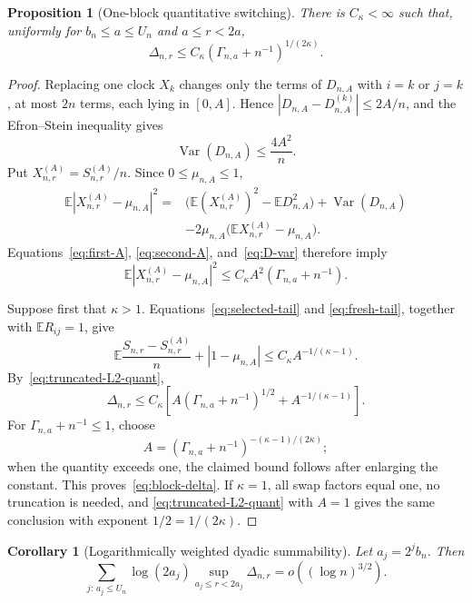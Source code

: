 \documentclass[11pt]{article}
\newtheorem{proposition}[theorem]{Proposition}
\newtheorem{corollary}[theorem]{Corollary}
\theoremstyle{remark}
\newcommand{\Ee}{\mathbb E}
\newcommand{\Var}{\operatorname{Var}}
\begin{document}
\begin{proposition}[One-block quantitative switching]\label{prop:block}
There is $C_\kappa<\infty$ such that, uniformly for
$b_n\leq a\leq U_n$ and $a\leq r<2a$,
\begin{equation}\label{eq:block-delta}
 \Delta_{n,r}\leq C_\kappa(\Gamma_{n,a}+n^{-1})^{1/(2\kappa)}.
\end{equation}
\end{proposition}

\begin{proof}
Replacing one clock $X_k$ changes only the terms of $D_{n,A}$ with
$i=k$ or $j=k$, at most $2n$ terms, each lying in $[0,A]$.  Hence
$|D_{n,A}-D_{n,A}^{(k)}|\leq2A/n$, and the Efron--Stein inequality gives
\begin{equation}\label{eq:D-var}
 \Var(D_{n,A})\leq\frac{4A^2}{n}.
\end{equation}
Put $X_{n,r}^{(A)}=S_{n,r}^{(A)}/n$.  Since
$0\leq\mu_{n,A}\leq1$,
\begin{align*}
 \Ee|X_{n,r}^{(A)}-\mu_{n,A}|^2
 ={}&\bigl(\Ee(X_{n,r}^{(A)})^2-\Ee D_{n,A}^2\bigr)
 +\Var(D_{n,A})\\
 &-2\mu_{n,A}\bigl(\Ee X_{n,r}^{(A)}-\mu_{n,A}\bigr).
\end{align*}
Equations~\eqref{eq:first-A}, \eqref{eq:second-A}, and~\eqref{eq:D-var}
therefore imply
\begin{equation}\label{eq:truncated-L2-quant}
 \Ee|X_{n,r}^{(A)}-\mu_{n,A}|^2
 \leq C_\kappa A^2(\Gamma_{n,a}+n^{-1}).
\end{equation}

Suppose first that $\kappa>1$.  Equations~\eqref{eq:selected-tail} and
\eqref{eq:fresh-tail}, together with $\Ee R_{ij}=1$, give
\[
 \Ee\frac{S_{n,r}-S_{n,r}^{(A)}}n
 +|1-\mu_{n,A}|
 \leq C_\kappa A^{-1/(\kappa-1)}.
\]
By~\eqref{eq:truncated-L2-quant},
\begin{equation}\label{eq:Delta-opt}
 \Delta_{n,r}
 \leq C_\kappa\left[
 A(\Gamma_{n,a}+n^{-1})^{1/2}
 +A^{-1/(\kappa-1)}
 \right].
\end{equation}
For $\Gamma_{n,a}+n^{-1}\leq1$, choose
\[
 A=(\Gamma_{n,a}+n^{-1})^{-(\kappa-1)/(2\kappa)};
\]
when the quantity exceeds one, the claimed bound follows after enlarging
the constant.  This proves~\eqref{eq:block-delta}.  If $\kappa=1$, all swap
factors equal one, no truncation is needed, and
\eqref{eq:truncated-L2-quant} with $A=1$ gives the same conclusion with
exponent $1/2=1/(2\kappa)$.
\end{proof}

\begin{corollary}[Logarithmically weighted dyadic summability]
\label{cor:weighted-sum}
Let $a_j=2^jb_n$.  Then
\begin{equation}\label{eq:weighted-sum}
 \sum_{j:\,a_j\leq U_n}
 \log(2a_j)
 \sup_{a_j\leq r<2a_j}\Delta_{n,r}
 =o((\log n)^{3/2}).
\end{equation}
\end{corollary}
\end{document}
